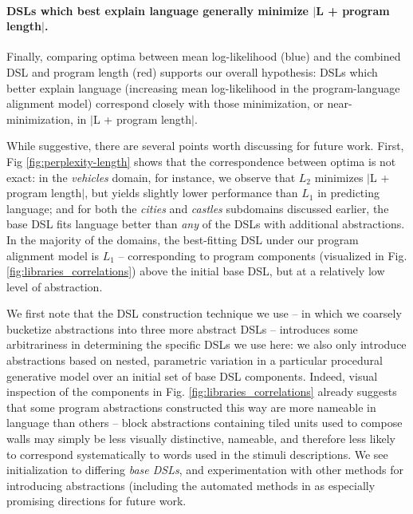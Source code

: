 \documentclass[10pt,letterpaper]{article}
\begin{document}
\paragraph{DSLs which best explain language generally minimize $|$L + program length$|$.} Finally, comparing optima between mean log-likelihood (blue) and the combined DSL and program length (red) supports our overall hypothesis: DSLs which better explain language (increasing mean log-likelihood in the program-language alignment model) correspond closely with those minimization, or near-minimization, in $|$L + program length$|$.

While suggestive, there are several points worth discussing for future work. First, Fig \ref{fig:perplexity-length} shows that the correspondence between optima is not exact: in the \textit{vehicles} domain, for instance, we observe that $L_2$ minimizes $|$L + program length$|$, but yields slightly lower performance than $L_1$ in predicting language; and for both the \textit{cities} and \textit{castles} subdomains discussed earlier, the base DSL fits language better than \textit{any} of the DSLs with additional abstractions. In the majority of the domains, the best-fitting DSL under our program alignment model is $L_1$ -- corresponding to program components (visualized in Fig. \ref{fig:libraries_correlations}) above the initial base DSL, but at a relatively low level of abstraction.

We first note that the DSL construction technique we use -- in which we coarsely bucketize abstractions into three more abstract DSLs -- introduces some arbitrariness in determining the specific DSLs we use here: we also only introduce abstractions based on nested, parametric variation in a particular procedural generative model over an initial set of base DSL components. Indeed, visual inspection of the components in Fig. \ref{fig:libraries_correlations} already suggests that some program abstractions constructed this way are more nameable in language than others -- block abstractions containing tiled units used to compose walls may simply be less visually distinctive, nameable, and therefore less likely to correspond systematically to words used in the stimuli descriptions. We see initialization to differing \textit{base DSLs}, and experimentation with other methods for introducing abstractions (including the automated methods in  as especially promising directions for future work.
\end{document}
